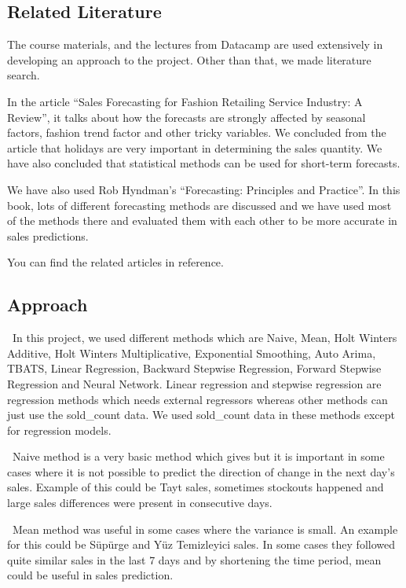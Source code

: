 \documentclass[]{article}
\begin{document}
\hypertarget{related-literature}{%
\subsection{Related Literature}\label{related-literature}}

The course materials, and the lectures from Datacamp are used
extensively in developing an approach to the project. Other than that,
we made literature search.

In the article ``Sales Forecasting for Fashion Retailing Service
Industry: A Review'', it talks about how the forecasts are strongly
affected by seasonal factors, fashion trend factor and other tricky
variables. We concluded from the article that holidays are very
important in determining the sales quantity. We have also concluded that
statistical methods can be used for short-term forecasts.

We have also used Rob Hyndman's ``Forecasting: Principles and
Practice''. In this book, lots of different forecasting methods are
discussed and we have used most of the methods there and evaluated them
with each other to be more accurate in sales predictions.

You can find the related articles in reference.

\hypertarget{approach}{%
\subsection{Approach}\label{approach}}

~In this project, we used different methods which are Naive, Mean, Holt
Winters Additive, Holt Winters Multiplicative, Exponential Smoothing,
Auto Arima, TBATS, Linear Regression, Backward Stepwise Regression,
Forward Stepwise Regression and Neural Network. Linear regression and
stepwise regression are regression methods which needs external
regressors whereas other methods can just use the sold\_count data. We
used sold\_count data in these methods except for regression models.

~Naive method is a very basic method which gives but it is important in
some cases where it is not possible to predict the direction of change
in the next day's sales. Example of this could be Tayt sales, sometimes
stockouts happened and large sales differences were present in
consecutive days.

~Mean method was useful in some cases where the variance is small. An
example for this could be Süpürge and Yüz Temizleyici sales. In some
cases they followed quite similar sales in the last 7 days and by
shortening the time period, mean could be useful in sales prediction.
\end{document}
